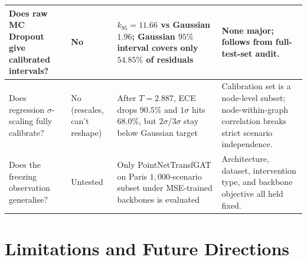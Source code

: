 \begin{table}[p]
\begin{tabular}{p{3.6cm}p{2.0cm}p{4.2cm}p{3.7cm}}
\midrule
Does raw MC Dropout give calibrated intervals? &
No &
$k_{95} = 11.66$ vs Gaussian $1.96$; Gaussian $95\%$ interval covers only $54.85\%$ of residuals &
None major; follows from full-test-set audit. \\
\midrule
Does regression $\sigma$-scaling fully calibrate? &
No (rescales, can't reshape) &
After $T = 2.887$, ECE drops $90.5\%$ and $1\sigma$ hits $68.0\%$, but $2\sigma$/$3\sigma$ stay below Gaussian target &
Calibration set is a node-level subset; node-within-graph correlation breaks strict scenario independence. \\
\midrule
Does the freezing observation generalise? &
Untested &
Only PointNetTransfGAT on Paris $1{,}000$-scenario subset under MSE-trained backbones is evaluated &
Architecture, dataset, intervention type, and backbone objective all held fixed. \\
\bottomrule
\end{tabular}
\end{table}

\section{Limitations and Future Directions}\label{sec:limitations}

